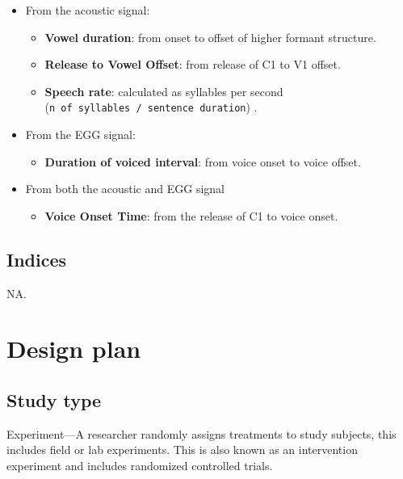 \documentclass[11pt,]{article}
\providecommand{\tightlist}{%
  \setlength{\itemsep}{0pt}\setlength{\parskip}{0pt}}
\begin{document}
\begin{itemize}
\tightlist
\item
  From the acoustic signal:

  \begin{itemize}
  \tightlist
  \item
    \textbf{Vowel duration}: from onset to offset of higher formant
    structure.
  \item
    \textbf{Release to Vowel Offset}: from release of C1 to V1 offset.
  \item
    \textbf{Speech rate}: calculated as syllables per second
    (\texttt{n\ of\ syllables\ /\ sentence\ duration}) \citep{plug2018}.
  \end{itemize}
\item
  From the EGG signal:

  \begin{itemize}
  \tightlist
  \item
    \textbf{Duration of voiced interval}: from voice onset to voice
    offset.
  \end{itemize}
\item
  From both the acoustic and EGG signal

  \begin{itemize}
  \tightlist
  \item
    \textbf{Voice Onset Time}: from the release of C1 to voice onset.
  \end{itemize}
\end{itemize}

\hypertarget{indices}{%
\subsection{Indices}\label{indices}}

NA.

\hypertarget{design-plan}{%
\section{Design plan}\label{design-plan}}

\hypertarget{study-type}{%
\subsection{Study type}\label{study-type}}

Experiment---A researcher randomly assigns treatments to study subjects,
this includes field or lab experiments. This is also known as an
intervention experiment and includes randomized controlled trials.
\end{document}
